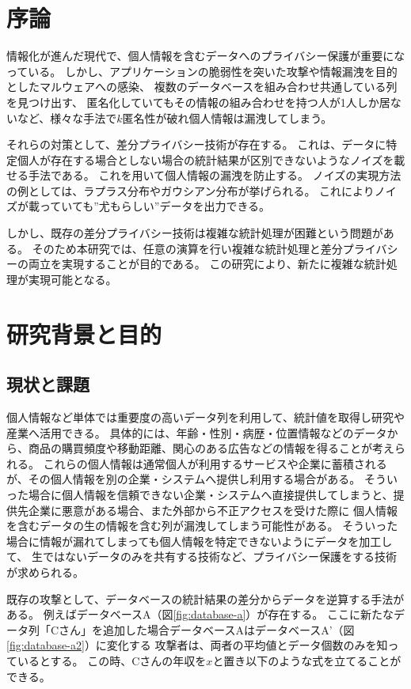 \documentclass[a4paper,11pt]{jreport}
\begin{document}
\pagebreak \setcounter{page}{1}

\chapter{序論}

情報化が進んだ現代で、個人情報を含むデータへのプライバシー保護が重要になっている。
しかし、アプリケーションの脆弱性を突いた攻撃や情報漏洩を目的としたマルウェアへの感染、
複数のデータベースを組み合わせ共通している列を見つけ出す、
匿名化していてもその情報の組み合わせを持つ人が1人しか居ないなど、様々な手法で$k$匿名性\cite{k-anon}が破れ個人情報は漏洩してしまう。

それらの対策として、差分プライバシー技術が存在する。
これは、データに特定個人が存在する場合としない場合の統計結果が区別できないようなノイズを載せる手法である。
これを用いて個人情報の漏洩を防止する。
ノイズの実現方法の例としては、ラプラス分布やガウシアン分布が挙げられる。
これによりノイズが載っていても”尤もらしい”データを出力できる。

しかし、既存の差分プライバシー技術は複雑な統計処理が困難という問題がある。
そのため本研究では、任意の演算を行い複雑な統計処理と差分プライバシーの両立を実現することが目的である。
この研究により、新たに複雑な統計処理が実現可能となる。

\chapter{研究背景と目的}

\section{現状と課題}

個人情報など単体では重要度の高いデータ列を利用して、統計値を取得し研究や産業へ活用できる。
具体的には、年齢・性別・病歴・位置情報などのデータから、商品の購買頻度や移動距離、関心のある広告などの情報を得ることが考えられる。
これらの個人情報は通常個人が利用するサービスや企業に蓄積されるが、その個人情報を別の企業・システムへ提供し利用する場合がある。
そういった場合に個人情報を信頼できない企業・システムへ直接提供してしまうと、提供先企業に悪意がある場合、また外部から不正アクセスを受けた際に
個人情報を含むデータの生の情報を含む列が漏洩してしまう可能性がある。
そういった場合に情報が漏れてしまっても個人情報を特定できないようにデータを加工して、
生ではないデータのみを共有する技術など、プライバシー保護をする技術が求められる。

既存の攻撃として、データベースの統計結果の差分からデータを逆算する手法がある。
例えばデータベースA（図\ref{fig:database-a}）が存在する。
ここに新たなデータ列「Cさん」を追加した場合データベースAはデータベースA'（図\ref{fig:database-a2}）に変化する
攻撃者は、両者の平均値とデータ個数のみを知っているとする。
この時、Cさんの年収を$x$と置き以下のような式を立てることができる。
\end{document}
